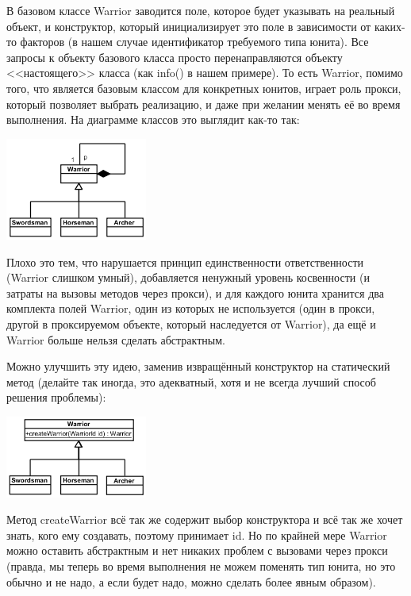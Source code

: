 \documentclass{../../text-style}
\begin{document}
В базовом классе Warrior заводится поле, которое будет указывать на реальный объект, и конструктор, который инициализирует это поле в зависимости от каких-то факторов (в нашем случае идентификатор требуемого типа юнита). Все запросы к объекту базового класса просто перенаправляются объекту <<настоящего>> класса (как info() в нашем примере). То есть Warrior, помимо того, что является базовым классом для конкретных юнитов, играет роль прокси, который позволяет выбрать реализацию, и даже при желании менять её во время выполнения. На диаграмме классов это выглядит как-то так:

\begin{center}
    \includegraphics[width=0.35\textwidth]{warriorVirtualCtor.png}
\end{center}

Плохо это тем, что нарушается принцип единственности ответственности (Warrior слишком умный), добавляется ненужный уровень косвенности (и затраты на вызовы методов через прокси), и для каждого юнита хранится два комплекта полей Warrior, один из которых не используется (один в прокси, другой в проксируемом объекте, который наследуется от Warrior), да ещё и Warrior больше нельзя сделать абстрактным.

Можно улучшить эту идею, заменив извращённый конструктор на статический метод (делайте так иногда, это адекватный, хотя и не всегда лучший способ решения проблемы):

\begin{center}
    \includegraphics[width=0.35\textwidth]{warriorFactoryMethod.png}
\end{center}

Метод createWarrior всё так же содержит выбор конструктора и всё так же хочет знать, кого ему создавать, поэтому принимает id. Но по крайней мере Warrior можно оставить абстрактным и нет никаких проблем с вызовами через прокси (правда, мы теперь во время выполнения не можем поменять тип юнита, но это обычно и не надо, а если будет надо, можно сделать более явным образом).
\end{document}
